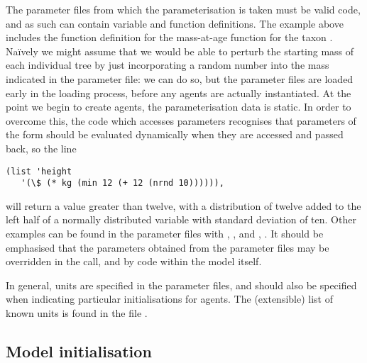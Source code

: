 The parameter files from which the parameterisation is taken must be valid
\Scheme code, and as such can contain variable and function definitions.  The
example above includes the function definition for the mass-at-age
function for the taxon .  Na\"ively we might
assume that we would be able to perturb the starting mass of each
individual tree by just incorporating a random number into the mass
indicated in the parameter file: we can do so, but the parameter files
are loaded early in the loading process, before any agents are
actually instantiated.  At the point we begin to create agents, the
parameterisation data is static.  In order to overcome this, the code
which accesses parameters recognises that parameters of the form
\symb{(\$ \ldots )} should be evaluated dynamically when they are
accessed and passed back, so the line

\begin{verbatim}
(list 'height 
   '(\$ (* kg (min 12 (+ 12 (nrnd 10)))))),
\end{verbatim}

will return a value greater than twelve, with a distribution of twelve
added to the left half of a normally distributed variable with standard deviation
of ten.  Other examples can be found in the parameter files with
, ,
 and , . 
It should be emphasised that the parameters obtained from the
parameter files may be overridden in the  call, and by
code within the model itself.

In general, units are specified in the parameter
files, and should also be specified when indicating particular
initialisations for agents.  The (extensible) list of known units is
found in the file .


\subsection{Model initialisation}

